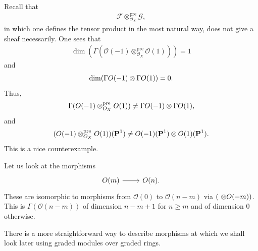 \documentclass [11 pt, oneside] {article}
\begin{document}
Recall that 
\begin{align*}
	\mathscr{F}\otimes^{\textrm{pre}}_{\mathscr{O}_X} \mathscr{G},
\end{align*}
in which one defines the tensor product in the most natural way, does not give a sheaf necessarily. One sees that
\begin{align*}
	\dim( \Gamma(\mathscr{O}(-1) \otimes^{\textrm{pre}}_{\mathscr{O}_X} \mathscr{O}(1) )) = 1
\end{align*}
and 
\begin{align*}
	\dim(\Gamma\relax{O}(-1) \otimes \Gamma\relax{O}(1) ) = 0.
\end{align*}
Thus, 
\begin{align*}
	\Gamma(\relax{O}(-1) \otimes^{\textrm{pre}}_{\relax{O}_X} \relax{O}(1) ) \ne \Gamma\relax{O}(-1) \otimes \Gamma\relax{O}(1),
\end{align*}
and
\begin{align*}
	(\relax{O}(-1) \otimes^{\textrm{pre}}_{\relax{O}_X} \relax{O}(1))(\mathbf{P}^1) \ne \relax{O}(-1) (\mathbf{P}^1) \otimes \relax{O}(1) (\mathbf{P}^1).
\end{align*}
This is a nice counterexample.

Let us look at the morphisms 
\[
\begin{tikzcd}
\mathscr{O}(m) \ar[r]& \mathscr{O}(n).
\end{tikzcd}
\]  
These are isomorphic to morphisms from $\mathscr{O}(0)$ to $\mathscr{O}(n-m)$ via $(\ \otimes \relax{O}(-m))$. This is $\Gamma(\mathscr{O}(n-m))$ of dimension $n-m+1$ for $n\ge m$ and of dimension $0$ otherwise.

\begin{remark}
	There is a more straightforward way to describe morphisms at which we shall look later using graded modules over graded rings.
\end{remark}
\end{document}
